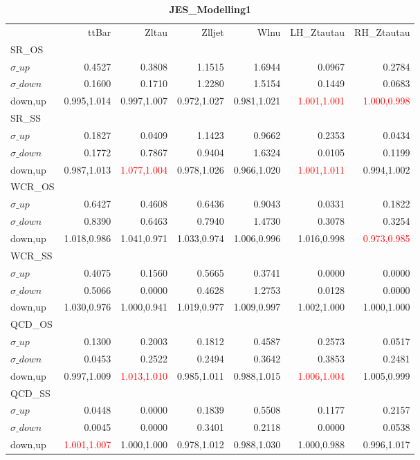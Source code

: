 \documentclass[11pt,oneside,a4paper]{article}
\begin{document}
\begin{table}
\centering
\caption{\bf{JES\_Modelling1}}
\begin{tabular}{lrrrrrr}
 & ttBar & Zltau & Zlljet & Wlnu & LH\_Ztautau & RH\_Ztautau \\
SR\_OS &  &  &  &  &  &  \\
$\sigma\_up$ & 0.4527 & 0.3808 & 1.1515 & 1.6944 & 0.0967 & 0.2784 \\
$\sigma\_down$ & 0.1600 & 0.1710 & 1.2280 & 1.5154 & 0.1449 & 0.0683 \\
down,up & 0.995,1.014 & 0.997,1.007 & 0.972,1.027 & 0.981,1.021 & \textcolor{red}{1.001,1.001} & \textcolor{red}{1.000,0.998} \\

\hline
SR\_SS &  &  &  &  &  &  \\
$\sigma\_up$ & 0.1827 & 0.0409 & 1.1423 & 0.9662 & 0.2353 & 0.0434 \\
$\sigma\_down$ & 0.1772 & 0.7867 & 0.9404 & 1.6324 & 0.0105 & 0.1199 \\
down,up & 0.987,1.013 & \textcolor{red}{1.077,1.004} & 0.978,1.026 & 0.966,1.020 & \textcolor{red}{1.001,1.011} & 0.994,1.002 \\

\hline
WCR\_OS &  &  &  &  &  &  \\
$\sigma\_up$ & 0.6427 & 0.4608 & 0.6436 & 0.9043 & 0.0331 & 0.1822 \\
$\sigma\_down$ & 0.8390 & 0.6463 & 0.7940 & 1.4730 & 0.3078 & 0.3254 \\
down,up & 1.018,0.986 & 1.041,0.971 & 1.033,0.974 & 1.006,0.996 & 1.016,0.998 & \textcolor{red}{0.973,0.985} \\

\hline
WCR\_SS &  &  &  &  &  &  \\
$\sigma\_up$ & 0.4075 & 0.1560 & 0.5665 & 0.3741 & 0.0000 & 0.0000 \\
$\sigma\_down$ & 0.5066 & 0.0000 & 0.4628 & 1.2753 & 0.0128 & 0.0000 \\
down,up & 1.030,0.976 & 1.000,0.941 & 1.019,0.977 & 1.009,0.997 & 1.002,1.000 & 1.000,1.000 \\

\hline
QCD\_OS &  &  &  &  &  &  \\
$\sigma\_up$ & 0.1300 & 0.2003 & 0.1812 & 0.4587 & 0.2573 & 0.0517 \\
$\sigma\_down$ & 0.0453 & 0.2522 & 0.2494 & 0.3642 & 0.3853 & 0.2481 \\
down,up & 0.997,1.009 & \textcolor{red}{1.013,1.010} & 0.985,1.011 & 0.988,1.015 & \textcolor{red}{1.006,1.004} & 1.005,0.999 \\

\hline
QCD\_SS &  &  &  &  &  &  \\
$\sigma\_up$ & 0.0448 & 0.0000 & 0.1839 & 0.5508 & 0.1177 & 0.2157 \\
$\sigma\_down$ & 0.0045 & 0.0000 & 0.3401 & 0.2118 & 0.0000 & 0.0538 \\
down,up & \textcolor{red}{1.001,1.007} & 1.000,1.000 & 0.978,1.012 & 0.988,1.030 & 1.000,0.988 & 0.996,1.017 \\

\hline
\end{tabular}
\end{table}
\end{document}
